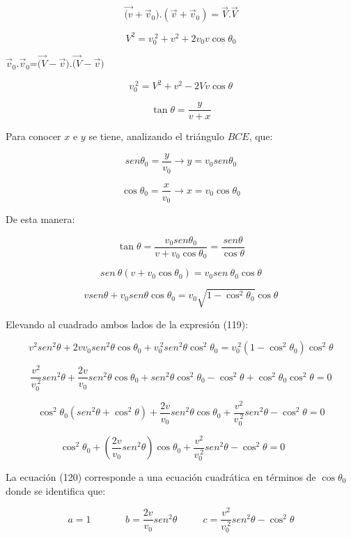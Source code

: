 \documentclass[]{article}
\begin{document}
\[\overrightarrow{(v} + {\overrightarrow{v}}_{0}).\left( \overrightarrow{v} + {\overrightarrow{v}}_{0} \right) = \overrightarrow{V}.\overrightarrow{V}\]

\[V^{2} = v_{0}^{\ 2} + v^{2} + 2v_{0}v\cos\theta_{0}\]

\({\overrightarrow{v}}_{0}.{\overrightarrow{v}}_{0}\)=\(\overrightarrow{(V} - \overrightarrow{v}).\overrightarrow{(V} - \overrightarrow{v})\)

\[v_{0}^{\ 2} = V^{2} + v^{2} - 2Vv\cos\theta_{}\]

\[\tan{\theta = \frac{y}{v + x}}\]

Para conocer \(x\) e \(y\) se tiene, analizando el triángulo \(BCE\),
que:

\[{sen}\theta_{0} = \frac{y}{v_{0}} \rightarrow y = v_{0}{sen}\theta_{0}\]

\[\cos\theta_{0} = \frac{x}{v_{0}} \rightarrow x = v_{0}\cos\theta_{0}\]

De esta manera:

\[\tan\theta = \frac{v_{0}{sen}\theta_{0}}{v + v_{0}\cos\theta_{0}} = \frac{{sen}\theta}{\cos\theta}\]

\[sen\ \theta\left( v + v_{0}\cos\theta_{0} \right) = v_{0}sen\ \theta_{0}\cos\theta\]

\[v{sen}\theta + v_{0}{sen}\theta\cos\theta_{0} = v_{0}\sqrt{1 - \cos^{2}\theta_{0}}\cos\theta\]

Elevando al cuadrado ambos lados de la expresión (119):

\[v^{2}{sen}^{2}\theta + 2v{v_{0}sen}^{2}\theta\cos\theta_{0} + v_{0}^{\ 2}{sen}^{2}\theta\cos^{2}\theta_{0} = v_{0}^{\ 2}\left( 1 - \cos^{2}\theta_{0} \right)\cos^{2}\theta\]

\[\frac{v^{2}}{v_{0}^{\ 2}}{sen}^{2}\theta + \frac{2v}{v_{0}}{sen}^{2}\theta\cos\theta_{0} + {sen}^{2}\theta\cos^{2}\theta_{0} - \cos^{2}\theta + \cos^{2}\theta_{0}\cos^{2}\theta = 0\]

\[\cos^{2}\theta_{0}\left( {sen}^{2}\theta + \cos^{2}\theta \right) + \frac{2v}{v_{0}}{sen}^{2}\theta\cos\theta_{0} + \frac{v^{2}}{v_{0}^{\ 2}}{sen}^{2}\theta - \cos^{2}\theta = 0\]

\[\cos^{2}\theta_{0} + \left( \frac{2v}{v_{0}}{sen}^{2}\theta \right)\cos\theta_{0} + \frac{v^{2}}{v_{0}^{\ 2}}{sen}^{2}\theta - \cos^{2}\theta = 0\ \ \ \ \ \ \ \ \]

La ecuación (120) corresponde a una ecuación cuadrática en términos de
\(\cos\theta_{0}\) donde se identifica que:

\[a = 1\ \ \ \ \ \ \ \ \ \ \ \ \ \ \ \ b = \frac{2v}{v_{0}}{sen}^{2}\theta\ \ \ \ \ \ \ \ \ \ \ \ c = \frac{v^{2}}{v_{0}^{\ 2}}{sen}^{2}\theta - \cos^{2}\theta\]
\end{document}
